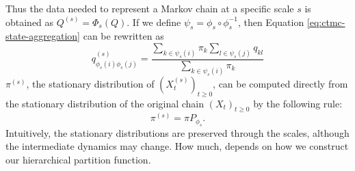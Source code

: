Thus the data needed to represent a Markov chain at a specific scale $s$ is obtained as $Q^{(s)} = \Phi_s(Q)$.
If we define $\psi_s = \phi_s \circ \phi_s^{-1}$, then Equation \ref{eq:ctmc-state-aggregation} can be rewritten as
\begin{equation}
	\nonumber
	q_{\phi_s(i)\phi_s(j)}^{(s)} = \frac{\sum_{k \in \psi_s(i)}\pi_k \sum_{l \in \psi_s(j)} q_{kl}}{\sum_{k \in \psi_s(i)}\pi_k}
\end{equation}
$\pi^{(s)}$, the stationary distribution of $(X_t^{(s)})_{t \ge 0}$, can be computed directly from
the stationary distribution of the original chain $(X_t)_{t \ge 0}$ by the following rule:
\begin{equation}
	\nonumber
	\pi^{(s)} = \pi P_{\phi_s}.
\end{equation}
Intuitively, the stationary distributions are preserved through the scales, although the intermediate dynamics may change. How much, depends on how we construct our hierarchical partition function. 

 

